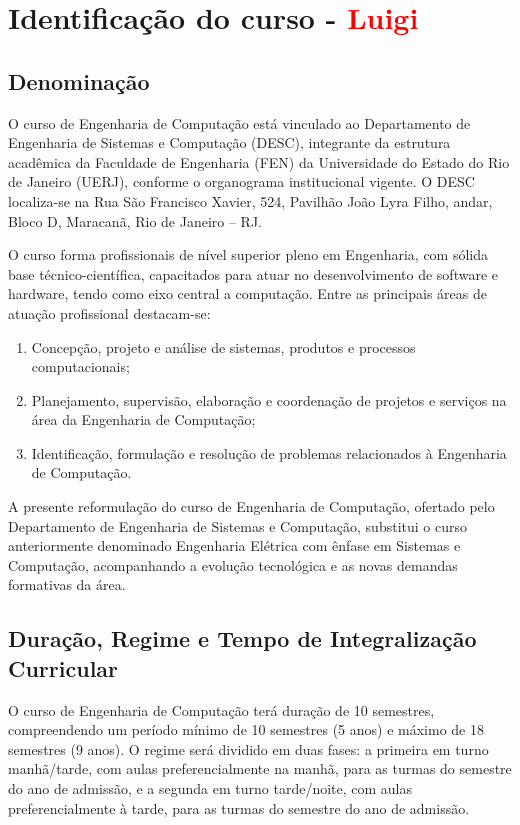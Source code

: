 \chapter{Identificação do curso - \textcolor{red}{Luigi}}
\section{Denominação}

O curso de Engenharia de Computação está vinculado ao Departamento de Engenharia de Sistemas e Computação (DESC), integrante da estrutura acadêmica da Faculdade de Engenharia (FEN) da Universidade do Estado do Rio de Janeiro (UERJ), conforme o organograma institucional vigente. O DESC localiza-se na Rua São Francisco Xavier,  524, Pavilhão João Lyra Filho,  andar, Bloco D, Maracanã, Rio de Janeiro – RJ.

O curso forma profissionais de nível superior pleno em Engenharia, com sólida base técnico-científica, capacitados para atuar no desenvolvimento de software e hardware, tendo como eixo central a computação. Entre as principais áreas de atuação profissional destacam-se:

\begin{enumerate}
  \item Concepção, projeto e análise de sistemas, produtos e processos computacionais;
  \item Planejamento, supervisão, elaboração e coordenação de projetos e serviços na área da Engenharia de Computação;
  \item Identificação, formulação e resolução de problemas relacionados à Engenharia de Computação.
\end{enumerate}

A presente reformulação do curso de Engenharia de Computação, ofertado pelo Departamento de Engenharia de Sistemas e Computação, substitui o curso anteriormente denominado Engenharia Elétrica com ênfase em Sistemas e Computação, acompanhando a evolução tecnológica e as novas demandas formativas da área.

\section{Duração, Regime e Tempo de Integralização Curricular}

O curso de Engenharia de Computação terá duração de 10 semestres, compreendendo um período mínimo de 10 semestres (5 anos) e máximo de 18 semestres (9 anos). O regime será dividido em duas fases: a primeira em turno manhã/tarde, com aulas preferencialmente na manhã, para as turmas do  semestre do ano de admissão, e a segunda em turno tarde/noite, com aulas preferencialmente à tarde, para as turmas do  semestre do ano de admissão.

